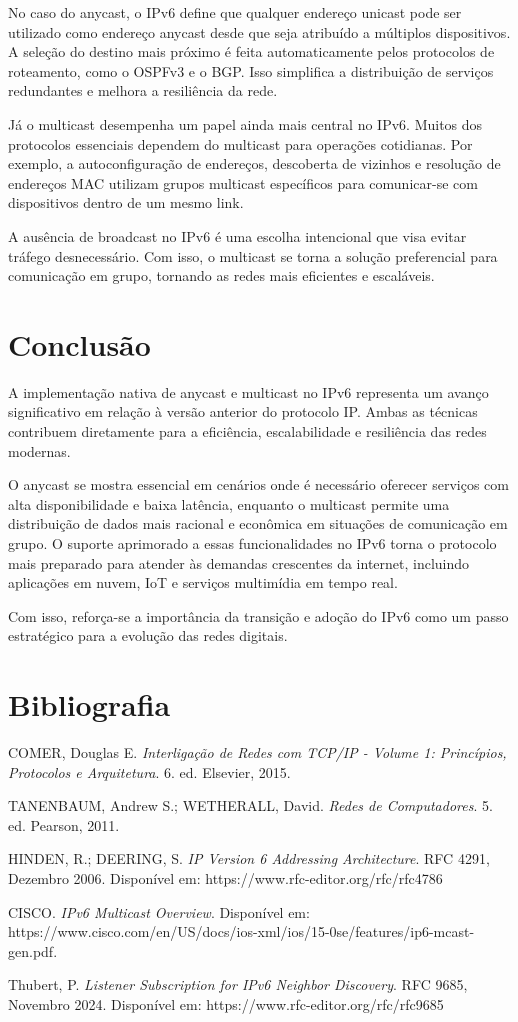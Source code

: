 \documentclass[12pt]{article}
\begin{document}
No caso do anycast, o IPv6 define que qualquer endereço unicast pode ser utilizado como endereço anycast desde que seja atribuído a múltiplos dispositivos. A seleção do destino mais próximo é feita automaticamente pelos protocolos de roteamento, como o OSPFv3 e o BGP. Isso simplifica a distribuição de serviços redundantes e melhora a resiliência da rede.

Já o multicast desempenha um papel ainda mais central no IPv6. Muitos dos protocolos essenciais dependem do multicast para operações cotidianas. Por exemplo, a autoconfiguração de endereços, descoberta de vizinhos e resolução de endereços MAC utilizam grupos multicast específicos para comunicar-se com dispositivos dentro de um mesmo link.

A ausência de broadcast no IPv6 é uma escolha intencional que visa evitar tráfego desnecessário. Com isso, o multicast se torna a solução preferencial para comunicação em grupo, tornando as redes mais eficientes e escaláveis.

\section{Conclusão}

A implementação nativa de anycast e multicast no IPv6 representa um avanço significativo em relação à versão anterior do protocolo IP. Ambas as técnicas contribuem diretamente para a eficiência, escalabilidade e resiliência das redes modernas.

O anycast se mostra essencial em cenários onde é necessário oferecer serviços com alta disponibilidade e baixa latência, enquanto o multicast permite uma distribui\-ção de dados mais racional e econômica em situações de comunicação em grupo. O suporte aprimorado a essas funcionalidades no IPv6 torna o protocolo mais preparado para atender às demandas crescentes da internet, incluindo aplicações em nuvem, IoT e serviços multimídia em tempo real.

Com isso, reforça-se a importância da transição e adoção do IPv6 como um passo estratégico para a evolução das redes digitais.

\section{Bibliografia}

COMER, Douglas E. \textit{Interligação de Redes com TCP/IP - Volume 1: Princípios, Protocolos e Arquitetura}. 6. ed. Elsevier, 2015.

TANENBAUM, Andrew S.; WETHERALL, David. \textit{Redes de Computadores}. 5. ed. Pearson, 2011.

HINDEN, R.; DEERING, S. \textit{IP Version 6 Addressing Architecture}. RFC 4291, Dezembro 2006. Disponível em: https://www.rfc-editor.org/rfc/rfc4786

CISCO. \textit{IPv6 Multicast Overview}. Disponível em: \\ https://www.cisco.com/en/US/docs/ios-xml/ios/15-0se/features/ip6-mcast-gen.pdf.

Thubert, P. \textit{Listener Subscription for IPv6 Neighbor Discovery}. RFC 9685, Novembro 2024. Disponível em: https://www.rfc-editor.org/rfc/rfc9685
\end{document}
